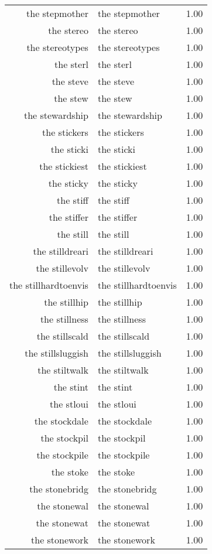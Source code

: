 \begin{table}[ht]
\begin{tabular}{rlr}
  the stepmother & the stepmother & 1.00 \\ 
  the stereo & the stereo & 1.00 \\ 
  the stereotypes & the stereotypes & 1.00 \\ 
  the sterl & the sterl & 1.00 \\ 
  the steve & the steve & 1.00 \\ 
  the stew & the stew & 1.00 \\ 
  the stewardship & the stewardship & 1.00 \\ 
  the stickers & the stickers & 1.00 \\ 
  the sticki & the sticki & 1.00 \\ 
  the stickiest & the stickiest & 1.00 \\ 
  the sticky & the sticky & 1.00 \\ 
  the stiff & the stiff & 1.00 \\ 
  the stiffer & the stiffer & 1.00 \\ 
  the still & the still & 1.00 \\ 
  the stilldreari & the stilldreari & 1.00 \\ 
  the stillevolv & the stillevolv & 1.00 \\ 
  the stillhardtoenvis & the stillhardtoenvis & 1.00 \\ 
  the stillhip & the stillhip & 1.00 \\ 
  the stillness & the stillness & 1.00 \\ 
  the stillscald & the stillscald & 1.00 \\ 
  the stillsluggish & the stillsluggish & 1.00 \\ 
  the stiltwalk & the stiltwalk & 1.00 \\ 
  the stint & the stint & 1.00 \\ 
  the stloui & the stloui & 1.00 \\ 
  the stockdale & the stockdale & 1.00 \\ 
  the stockpil & the stockpil & 1.00 \\ 
  the stockpile & the stockpile & 1.00 \\ 
  the stoke & the stoke & 1.00 \\ 
  the stonebridg & the stonebridg & 1.00 \\ 
  the stonewal & the stonewal & 1.00 \\ 
  the stonewat & the stonewat & 1.00 \\ 
  the stonework & the stonework & 1.00 \\ 

\end{tabular}
\end{table}
